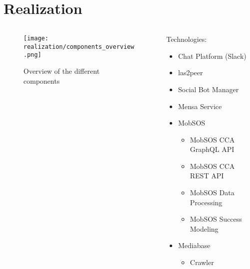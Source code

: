 



\section{Realization}

\begin{frame}\begin{columns}
    \begin{column}[]{0.7\textwidth}
      \begin{figure}
        \centering
        \texttt{[image: realization/components\_overview.png]}
        \caption{Overview of the different components}
        \label{fig:componentsOverview}
      \end{figure}
    \end{column}
    \begin{column}[]{0.3\textwidth}
      Technologies:
      \begin{itemize}
        \item Chat Platform (Slack)
        \item las2peer
        \item Social Bot Manager
        \item Mensa Service
        \item MobSOS
              \begin{itemize}
                \item MobSOS CCA GraphQL API
                \item MobSOS CCA REST API
                \item MobSOS Data Processing
                \item MobSOS Success Modeling
              \end{itemize}
        \item Mediabase
              \begin{itemize}
                \item Crawler
              \end{itemize}
      \end{itemize}
    \end{column}
  \end{columns}
\end{frame}

